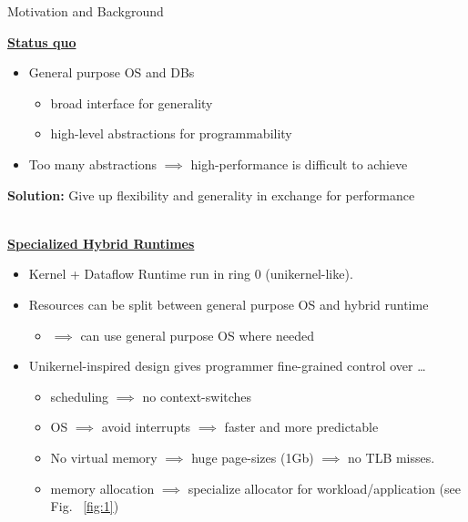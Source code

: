 \begin{block}{Motivation and Background}




\underline{\textbf{Status quo}}
  \begin{itemize}
  \item General purpose OS and DBs%
    \begin{itemize}
    \item broad interface for generality
    \item high-level abstractions for programmability
    \end{itemize}
    \item Too many abstractions $\implies$ high-performance is difficult to achieve
    \end{itemize}
    \begin{center}
 \alert{\textbf{Solution:} Give up flexibility and generality in exchange for performance}
\end{center}
\\[7mm]
    
\underline{\textbf{Specialized Hybrid Runtimes}}
    \begin{itemize}
    \item Kernel + Dataflow Runtime run in ring 0 (unikernel-like).
    \item Resources can be split between general purpose OS and hybrid runtime
      \begin{itemize}
      \item $\implies$ can use general purpose OS where needed
    \end{itemize}

    \item {Unikernel-inspired design gives programmer fine-grained control over \ldots}
      \begin{itemize}
      \item scheduling $\implies$ no context-switches
      \item OS $\implies$ avoid interrupts $\implies$ faster and more predictable
      \item No virtual memory $\implies$ huge page-sizes (1Gb) $\implies$ no TLB misses.
      \item memory allocation $\implies$ specialize allocator for workload/application (see Fig.~ \ref{fig:1})
      \end{itemize}
    \end{itemize}


\end{block}
